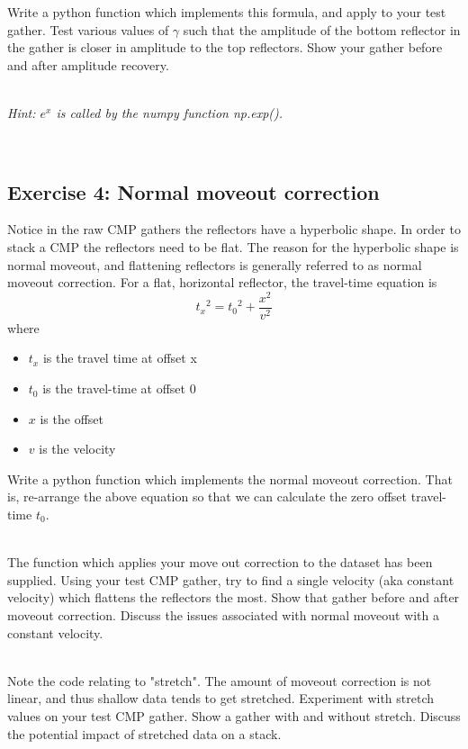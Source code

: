 Write a python function which implements this formula, and apply to your test gather.  Test various values of $\gamma$ such that the amplitude of the bottom reflector in the gather is closer in amplitude to the top reflectors. Show your gather before and after amplitude recovery. 
\par~\\
\emph{Hint: $e^x$ is called by the numpy function np.exp().}
\par~\\

\subsection*{Exercise 4: Normal moveout correction}
Notice in the raw CMP gathers the reflectors have a hyperbolic shape.  In order to stack a CMP the reflectors need to be flat.  The reason for the hyperbolic shape is normal moveout, and flattening reflectors is generally referred to as normal moveout correction.  For a flat, horizontal reflector, the travel-time equation is
\[ {t_x}^2 = {t_0}^2 + \frac{x^2}{v^2}\]
where
\begin{itemize}
\item $t_x$ is the travel time at offset x
\item $t_0$ is the travel-time at offset 0
\item $x$ is the offset
\item $v$ is the velocity
\end{itemize}
Write a python function which implements the normal moveout correction. That is, re-arrange the above equation so that we can calculate the zero offset travel-time $t_0$.
\par~\\
The function which applies your move out correction to the dataset has been supplied. Using your test CMP gather, try to find a single velocity (aka constant velocity) which flattens the reflectors the most. Show that gather before and after moveout correction.  Discuss the issues associated with normal moveout with a constant velocity.
\par~\\
Note the code relating to "stretch".  The amount of moveout correction is not linear, and thus shallow data tends to get stretched. Experiment with stretch values on your test CMP gather. Show a gather with and without stretch.  Discuss the potential impact of stretched data on a stack.

